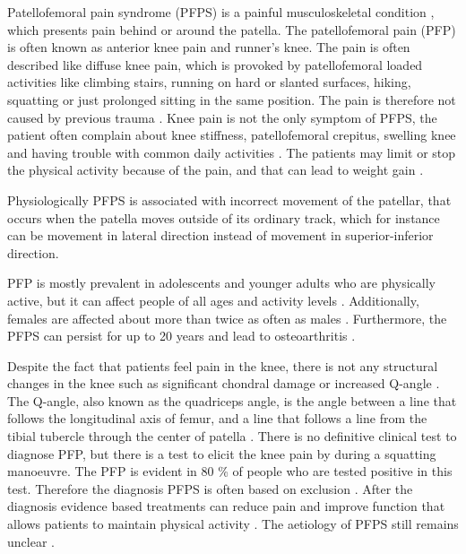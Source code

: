 Patellofemoral pain syndrome (PFPS) is a painful musculoskeletal condition \citep{Maclachlan2017, Smith2015}, which presents pain behind or around the patella. The patellofemoral pain (PFP) is often known as anterior knee pain and runner’s knee. The pain is often described like diffuse knee pain, which is provoked by patellofemoral loaded activities like climbing stairs, running on hard or slanted surfaces, hiking, squatting or just prolonged sitting in the same position.\citep{Crossley2016, Crossley2015, Smith2015, Boudreau2017} The pain is therefore not caused by previous trauma \citep{Crossley2016}.
Knee pain is not the only symptom of PFPS, the patient often complain about knee stiffness, patellofemoral crepitus, swelling knee and having trouble with common daily activities \citep{Martini2012, Crossley2016}. The patients may limit or stop the physical activity because of the pain, and that can lead to weight gain \citep{Petersen2013, Crossley2016}.

Physiologically PFPS is associated with incorrect movement of the patellar, that occurs when the patella moves outside of its ordinary track, which for instance can be movement in lateral direction instead of movement in superior-inferior direction.\citep{Martini2012}

PFP is mostly prevalent in adolescents and younger adults who are physically active, but it can affect people of all ages and activity levels \citep{Crossley2016, Maclachlan2017, Crossley2015}. Additionally,  females are affected about more than twice as often as males \citep{Petersen2013}. Furthermore, the PFPS can persist for up to 20 years and lead to osteoarthritis \citep{Petersen2013, Crossley2016}.

Despite the fact that patients feel pain in the knee, there is not any structural changes in the knee such as significant chondral damage or increased Q-angle \citep{Petersen2013}. The Q-angle, also known as the quadriceps angle, is the angle between a line that follows the longitudinal axis of femur, and a line that follows a line from the tibial tubercle through the center of patella \citep{Dahab2011}.
There is no definitive clinical test to diagnose PFP, but there is a test to elicit the knee pain by during a squatting manoeuvre. The PFP is evident in 80 \% of people who are tested positive in this test.\citep{Crossley2016, Crossley2015} Therefore the diagnosis PFPS is often based on exclusion \citep{Petersen2013}. After the diagnosis  evidence based treatments can reduce pain and improve function that allows patients to maintain physical activity \citep{Crossley2015}.
The aetiology of PFPS still remains unclear \citep{Smith2015}.
